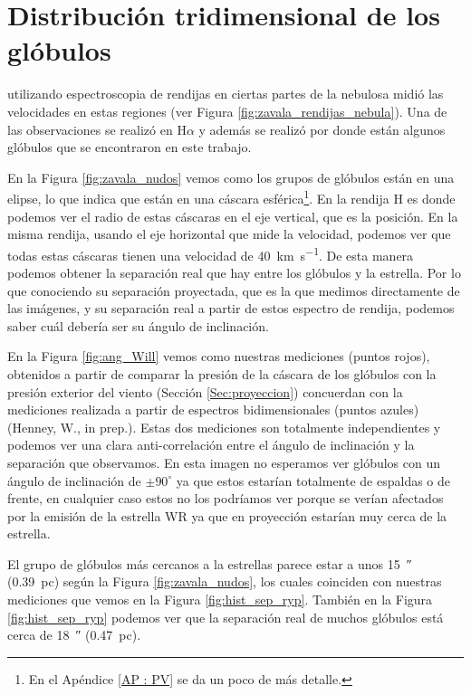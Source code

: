 \documentclass{book}
\begin{document}

\section{Distribución tridimensional de los glóbulos} \label{sec: distrtibucion}

\cite{Zavala:2022} utilizando espectroscopia de rendijas en ciertas partes de la nebulosa midió las velocidades en estas regiones (ver Figura \ref{fig:zavala_rendijas_nebula}). Una de las observaciones se realizó en H$\alpha$ y además se realizó por donde están algunos glóbulos que se encontraron en este trabajo. 

En la Figura \ref{fig:zavala_nudos} vemos como los grupos de glóbulos están en una elipse, lo que indica que están en una cáscara esférica\footnote{En el Apéndice \ref{AP : PV} se da un poco de más detalle.}. En la rendija H es donde podemos ver el radio de estas cáscaras en el eje vertical, que es la posición. En la misma rendija, usando el eje horizontal que mide la velocidad, podemos ver que todas estas cáscaras tienen una velocidad de \SI{40}{km.s^{-1}}. De esta manera podemos obtener la separación real que hay entre los glóbulos y la estrella. Por lo que conociendo su separación proyectada, que es la que medimos directamente de las imágenes, y su separación real a partir de estos espectro de rendija, podemos saber cuál debería ser su ángulo de inclinación.

En la Figura \ref{fig:ang_Will} vemos como nuestras mediciones (puntos rojos), obtenidos a partir de comparar la presión de la cáscara de los glóbulos con la presión exterior del viento (Sección \ref{Sec:proyeccion}) concuerdan con la mediciones realizada a partir de espectros bidimensionales (puntos azules) (Henney, W., in prep.). Estas dos mediciones son totalmente independientes y podemos ver una clara anti-correlación entre el ángulo de inclinación y la separación que observamos. En esta imagen no esperamos ver glóbulos con un ángulo de inclinación de $\pm 90^\circ$ ya que estos estarían totalmente de espaldas o de frente, en cualquier caso estos no los podríamos ver porque se verían afectados por la emisión de la estrella WR ya que en proyección estarían muy cerca de la estrella.

El grupo de glóbulos más cercanos a la estrellas parece estar a unos \SI{15}{\arcsecond} (\SI{0.39}{pc}) según la Figura \ref{fig:zavala_nudos}, los cuales coinciden con nuestras mediciones que vemos en la Figura \ref{fig:hist_sep_ryp}. También en la Figura \ref{fig:hist_sep_ryp} podemos ver que la separación real de muchos glóbulos está cerca de \SI{18}{\arcsecond} (\SI{0.47}{pc}).
\end{document}
